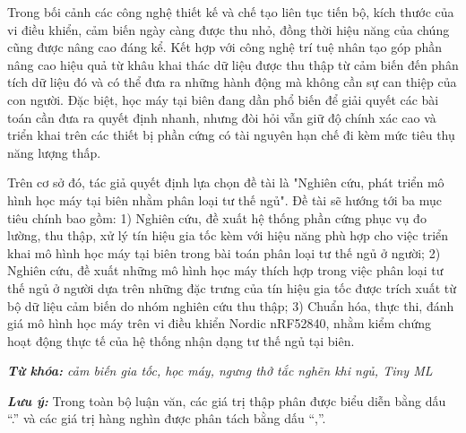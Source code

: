 Trong bối cảnh các công nghệ thiết kế và chế tạo liên tục tiến bộ, kích thước
của vi điều khiển, cảm biến ngày càng được thu nhỏ, đồng thời hiệu năng của
chúng cũng được nâng cao đáng kể. Kết hợp với công nghệ trí tuệ nhân tạo góp
phần nâng cao hiệu quả từ khâu khai thác dữ liệu được thu thập từ cảm biến đến
phân tích dữ liệu đó và có thể đưa ra những hành động mà không cần sự can thiệp
của con người. Đặc biệt, học máy tại biên đang dần phổ biến để giải quyết các
bài toán cần đưa ra quyết định nhanh, nhưng đòi hỏi vẫn giữ độ chính xác cao và
triển khai trên các thiết bị phần cứng có tài nguyên hạn chế đi kèm mức tiêu
thụ năng lượng thấp.

Trên cơ sở đó, tác giả quyết định lựa chọn đề tài là "Nghiên cứu, phát triển mô
hình học máy tại biên nhằm phân loại tư thế ngủ". Đề tài sẽ hướng tới ba mục
tiêu chính bao gồm: 1) Nghiên cứu, đề xuất hệ thống phần cứng phục vụ đo lường,
thu thập, xử lý tín hiệu gia tốc kèm với hiệu năng phù hợp cho việc triển khai
mô hình học máy tại biên trong bài toán phân loại tư thế ngủ ở người; 2) Nghiên
cứu, đề xuất những mô hình học máy thích hợp trong việc phân loại tư thế ngủ ở
người dựa trên những đặc trưng của tín hiệu gia tốc được trích xuất từ bộ dữ
liệu cảm biến do nhóm nghiên cứu thu thập; 3) Chuẩn hóa, thực thi, đánh giá mô
hình học máy trên vi điều khiển Nordic nRF52840, nhằm kiểm chứng hoạt động thực
tế của hệ thống nhận dạng tư thế ngủ tại biên.

\vspace{-0.5cm}
\begin{flushleft}
	\textit{\textbf{Từ khóa: } cảm biến gia tốc, học máy, ngưng thở tắc nghẽn khi ngủ,  Tiny ML}
\end{flushleft}

\vspace{0.2cm}
\noindent\textbf{\textit{Lưu ý:}} Trong toàn bộ luận văn, các giá trị thập phân được biểu diễn bằng dấu “.” và các giá trị hàng nghìn được phân tách bằng dấu “,”.

\changefontsizes[16pt]{13pt}

